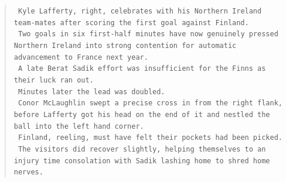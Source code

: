 \documentclass[a4paper, 12pt]{article}
\begin{document}
\begin{quotation}
\texttt{
Kyle Lafferty,  right,  celebrates with his Northern Ireland team-mates after scoring the first goal against Finland.
}\\

\texttt{
 Two goals in six first-half minutes have now genuinely pressed Northern Ireland into strong contention for automatic advancement to France next year.
}\\

\texttt{
 A late Berat Sadik effort was insufficient for the Finns as their luck ran out.
}\\

\texttt{
 Minutes later the lead was doubled.
}\\

\texttt{
 Conor McLaughlin swept a precise cross in from the right flank,  before Lafferty got his head on the end of it and nestled the ball into the left hand corner.
}\\

\texttt{
 Finland,  reeling,  must have felt their pockets had been picked.
}\\

\texttt{
 The visitors did recover slightly,  helping themselves to an injury time consolation with Sadik lashing home to shred home nerves.}\\
\end{quotation}


\newpage
\printindex
\end{document}
